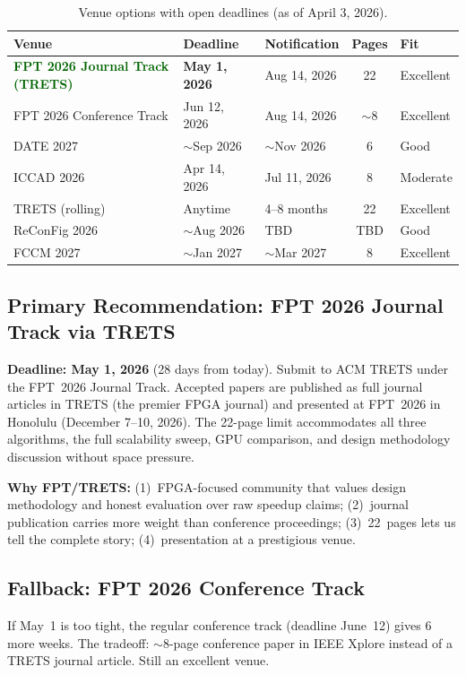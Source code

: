 \documentclass[11pt]{article}
\newcommand{\done}[1]{\textcolor{darkgreen}{\textbf{#1}}}
\begin{document}
\begin{table}[H]
\centering
\caption{Venue options with open deadlines (as of April 3, 2026).}
\label{tab:venues}
\small
\begin{tabular}{lllcl}
\toprule
\textbf{Venue} & \textbf{Deadline} & \textbf{Notification} & \textbf{Pages} & \textbf{Fit} \\
\midrule
\done{FPT 2026 Journal Track (TRETS)} & \textbf{May 1, 2026} & Aug 14, 2026 & 22 & Excellent \\
FPT 2026 Conference Track & Jun 12, 2026 & Aug 14, 2026 & $\sim$8 & Excellent \\
DATE 2027 & $\sim$Sep 2026 & $\sim$Nov 2026 & 6 & Good \\
ICCAD 2026 & Apr 14, 2026 & Jul 11, 2026 & 8 & Moderate \\
TRETS (rolling) & Anytime & 4--8 months & 22 & Excellent \\
ReConFig 2026 & $\sim$Aug 2026 & TBD & TBD & Good \\
FCCM 2027 & $\sim$Jan 2027 & $\sim$Mar 2027 & 8 & Excellent \\
\bottomrule
\end{tabular}
\end{table}

\subsection{Primary Recommendation: FPT 2026 Journal Track via TRETS}

\textbf{Deadline: May 1, 2026} (28 days from today). Submit to ACM TRETS under
the FPT~2026 Journal Track. Accepted papers are published as full journal articles
in TRETS (the premier FPGA journal) and presented at FPT~2026 in Honolulu
(December 7--10, 2026). The 22-page limit accommodates all three algorithms,
the full scalability sweep, GPU comparison, and design methodology discussion
without space pressure.

\textbf{Why FPT/TRETS:} (1)~FPGA-focused community that values design methodology
and honest evaluation over raw speedup claims; (2)~journal publication carries
more weight than conference proceedings; (3)~22~pages lets us tell the complete
story; (4)~presentation at a prestigious venue.

\subsection{Fallback: FPT 2026 Conference Track}

If May~1 is too tight, the regular conference track (deadline June~12) gives
6 more weeks. The tradeoff: $\sim$8-page conference paper in IEEE Xplore
instead of a TRETS journal article. Still an excellent venue.
\end{document}
